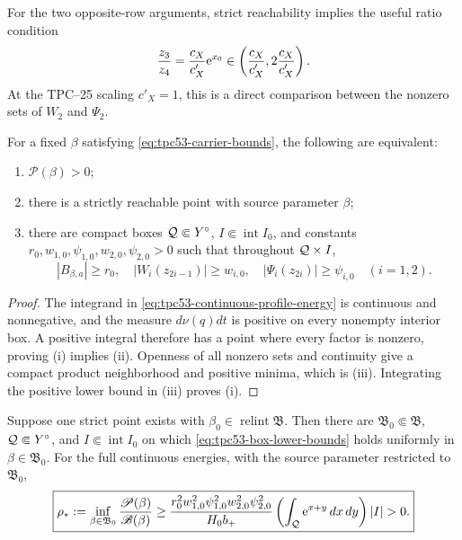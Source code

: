For the two opposite-row arguments, strict reachability implies the
useful ratio condition
\begin{equation}
 \frac{z_3}{z_4}=\frac{c_X}{c'_X}\mathrm e^{x_0}
 \in\left(\frac{c_X}{c'_X},
          2\frac{c_X}{c'_X}\right).
 \label{eq:tpc53-support-ratio}
\end{equation}
At the TPC--25 scaling \(c'_X=1\), this is a direct comparison between
the nonzero sets of \(W_2\) and \(\Psi_2\).

\begin{theorem}
\label{thm:tpc53-support-equivalence}
For a fixed \(\beta\) satisfying
\eqref{eq:tpc53-carrier-bounds}, the following are equivalent:
\begin{enumerate}[label=\textup{(\roman*)},leftmargin=3em]
 \item \(\mathscr P(\beta)>0\);
 \item there is a strictly reachable point with source parameter
 \(\beta\);
 \item there are compact boxes \(\mathcal Q\Subset Y^\circ\),
 \(I\Subset\operatorname{int}I_0\), and constants
 \(r_0,w_{1,0},\psi_{1,0},w_{2,0},\psi_{2,0}>0\) such that throughout
 \(\mathcal Q\times I\),
 \begin{equation}
 |B_{\beta,a}|\ge r_0,\quad
 |W_i(z_{2i-1})|\ge w_{i,0},\quad
 |\Psi_i(z_{2i})|\ge\psi_{i,0}\quad(i=1,2).
 \label{eq:tpc53-box-lower-bounds}
 \end{equation}
\end{enumerate}
\end{theorem}

\begin{proof}
The integrand in \eqref{eq:tpc53-continuous-profile-energy} is
continuous and nonnegative, and the measure
\(d\nu(q)dt\) is positive on every nonempty interior box.  A positive
integral therefore has a point where every factor is nonzero, proving
\textup{(i)} implies \textup{(ii)}.  Openness of all nonzero sets and
continuity give a compact product neighborhood and positive minima,
which is \textup{(iii)}.  Integrating the positive lower bound in
\textup{(iii)} proves \textup{(i)}.
\end{proof}

\begin{theorem}
\label{thm:tpc53-explicit-overlap}
Suppose one strict point exists with
\(\beta_0\in\operatorname{relint}\mathfrak B\).  Then there are
\(\mathfrak B_0\Subset\mathfrak B\), \(\mathcal Q\Subset Y^\circ\), and
\(I\Subset\operatorname{int}I_0\) on which
\eqref{eq:tpc53-box-lower-bounds} holds uniformly in
\(\beta\in\mathfrak B_0\).  For the full continuous energies, with the
source parameter restricted to \(\mathfrak B_0\),
\begin{equation}
 \boxed{
 \rho_*:=\inf_{\beta\in\mathfrak B_0}
 \frac{\mathscr P(\beta)}{\mathscr B(\beta)}
 \ge
 \frac{r_0^2w_{1,0}^2\psi_{1,0}^2w_{2,0}^2\psi_{2,0}^2}
      {H_0b_+}
 \left(\int_{\cQ}\e^{x+y}\,dx\,dy\right)|I|>0.}
 \label{eq:tpc53-explicit-rho}
\end{equation}
\end{theorem}

